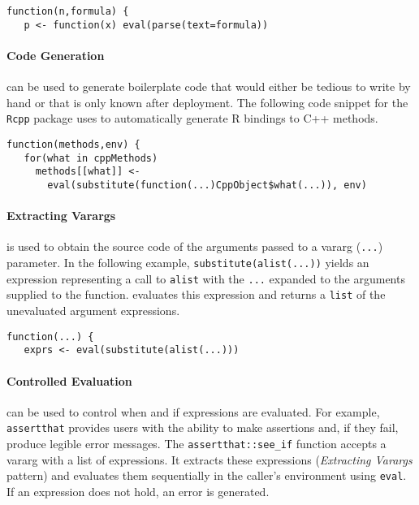 \documentclass[acmsmall, screen]{acmart}
\renewcommand{\k}[1]{\lstinline |#1|\xspace}
\begin{document}
\begin{lstlisting}[caption={\c{AdapSamp::rARS}}, captionpos=b]
 function(n,formula) {
   p <- function(x) eval(parse(text=formula))
\end{lstlisting}

\paragraph{Code Generation}
\Eval can be used to generate boilerplate code that would either be tedious to
write by hand or that is only known after deployment. The following code snippet
for the \k{Rcpp} package uses \eval to automatically generate R bindings to C++
methods.

\begin{lstlisting}[caption={\k{Rcpp::.makeCppMethods}}, captionpos=b]
 function(methods,env) {
   for(what in cppMethods)
     methods[[what]] <-
       eval(substitute(function(...)CppObject$what(...)), env)
\end{lstlisting}

\paragraph{Extracting Varargs}
\Eval is used to obtain the source code of the arguments passed to a vararg
(\k{...}) parameter. In the following example, \k{substitute(alist(...))} yields
an expression representing a call to \k{alist} with the \k{...} expanded to the
arguments supplied to the function. \Eval evaluates this expression and returns
a \k{list} of the unevaluated argument expressions.

\begin{lstlisting}[caption={\k{statnet.common::NVM}}, captionpos=b]
 function(...) {
   exprs <- eval(substitute(alist(...)))
\end{lstlisting}\medskip

\paragraph{Controlled Evaluation}
\Eval can be used to control when and if expressions are evaluated. For example,
\k{assertthat} provides users with the ability to make assertions and, if they
fail, produce legible error messages. The \k{assertthat::see_if} function
accepts a vararg with a list of expressions. It extracts these expressions
(\emph{Extracting Varargs} pattern) and evaluates them sequentially in the
caller's environment using \k{eval}. If an expression does not hold, an error is
generated.
\end{document}
